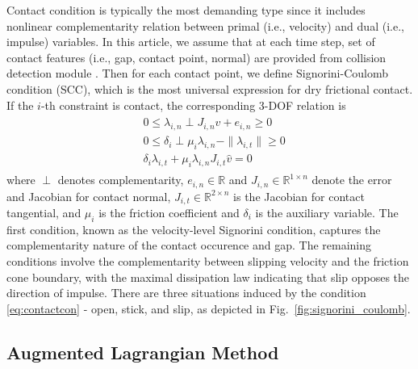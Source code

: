 \documentclass[lettersize,journal]{IEEEtran}
\begin{document}
Contact condition is typically the most demanding type since it includes nonlinear complementarity relation between primal (i.e., velocity) and dual (i.e., impulse) variables.
In this article, we assume that at each time step, set of contact features (i.e., gap, contact point, normal) are provided from collision detection module \cite{pan2012fcl,lee2023differentiable}.
Then for each contact point, we define Signorini-Coulomb condition (SCC), which is the most universal expression for dry frictional contact.
If the $i$-th constraint is contact, the corresponding 3-DOF relation is
\begin{align} \label{eq:contactcon}
    \begin{split}
    & 0 \le \lambda_{i,n} \perp J_{i,n}\hat{v} + e_{i,n} \ge 0 \\
    & 0 \le \delta_i \perp \mu_i\lambda_{i,n} - \| \lambda_{i,t} \| \ge 0 \\
    &\delta_i \lambda_{i,t} + \mu_i\lambda_{i,n} J_{i,t}\hat{v} = 0
    \end{split}
\end{align} 
where $\perp$ denotes complementarity, $e_{i,n}\in\mathbb{R}$ and $J_{i,n}\in\mathbb{R}^{1\times n}$ denote the error and Jacobian for contact normal, $J_{i,t}\in\mathbb{R}^{2\times n}$ is the Jacobian for contact tangential, and $\mu_i$ is the friction coefficient and $\delta_i$ is the auxiliary variable.
The first condition, known as the velocity-level Signorini condition, captures the complementarity nature of the contact occurence and gap. 
The remaining conditions involve the complementarity between slipping velocity and the friction cone boundary, with the maximal dissipation law indicating that slip opposes the direction of impulse.
There are three situations induced by the condition \eqref{eq:contactcon} - open, stick, and slip, as depicted in Fig.~\ref{fig:signorini_coulomb}. 



\subsection{Augmented Lagrangian Method}
\end{document}
